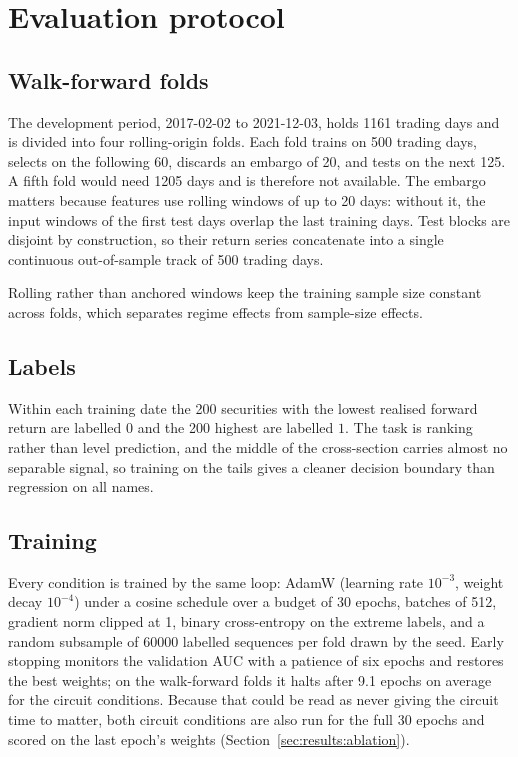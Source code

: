 \section{Evaluation protocol}
\label{sec:protocol}

\subsection{Walk-forward folds}
\label{sec:protocol:folds}
The development period, 2017-02-02 to 2021-12-03, holds \num{1161} trading
days and is divided into four rolling-origin folds. Each fold trains on
\num{500} trading days, selects on the following \num{60}, discards an embargo
of \num{20}, and tests on the next \num{125}. A fifth fold would need
\num{1205} days and is therefore not available. The embargo matters because features use rolling windows of up to
\num{20} days: without it, the input windows of the first test days overlap the
last training days. Test blocks are disjoint by construction, so their return
series concatenate into a single continuous out-of-sample track of \num{500}
trading days.

Rolling rather than anchored windows keep the training sample size constant
across folds, which separates regime effects from sample-size effects.

\subsection{Labels}
\label{sec:protocol:labels}
Within each training date the \num{200} securities with the lowest realised
forward return are labelled $0$ and the \num{200} highest are labelled $1$. The
task is ranking rather than level prediction, and the middle of the
cross-section carries almost no separable signal, so training on the tails gives
a cleaner decision boundary than regression on all names.

\subsection{Training}
\label{sec:protocol:training}
Every condition is trained by the same loop: AdamW (learning rate $10^{-3}$,
weight decay $10^{-4}$) under a cosine schedule over a budget of \num{30}
epochs, batches of \num{512}, gradient norm clipped at \num{1}, binary
cross-entropy on the extreme labels, and a random subsample of \num{60000}
labelled sequences per fold drawn by the seed. Early stopping monitors the
validation AUC with a patience of six epochs and restores the best weights; on
the walk-forward folds it halts after \num{9.1} epochs on average for the
circuit conditions. Because that could be read as never giving the circuit time
to matter, both circuit conditions are also run for the full \num{30} epochs
and scored on the last epoch's weights (Section~\ref{sec:results:ablation}).


